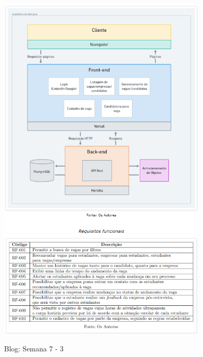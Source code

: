 \begin{apendicesenv}
\begin{figure}[H]
	\includegraphics[width=0.9\textwidth]{../imagens/blog-posts/semana07-2.png}
\end{figure}
\begin{figure}[H]
	\centering
	\caption{Blog: Semana 7 - 3}

\end{figure}
\end{apendicesenv}

